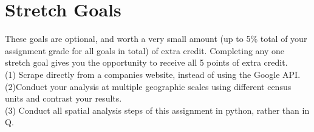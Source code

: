 \documentclass[a4paper, 11pt]{article}
\begin{document}
\section{Stretch Goals}
These goals are optional, and worth a very small amount (up to 5\% total of your assignment grade for all goals in total) of extra credit.  Completing any one stretch goal gives you the opportunity to receive all 5 points of extra credit.\\
(1) Scrape directly from a companies website, instead of using the Google API.\\
(2)Conduct your analysis at multiple geographic scales using different census units and contrast your results.\\
(3) Conduct all spatial analysis steps of this assignment in python, rather than in Q.
\end{document}

